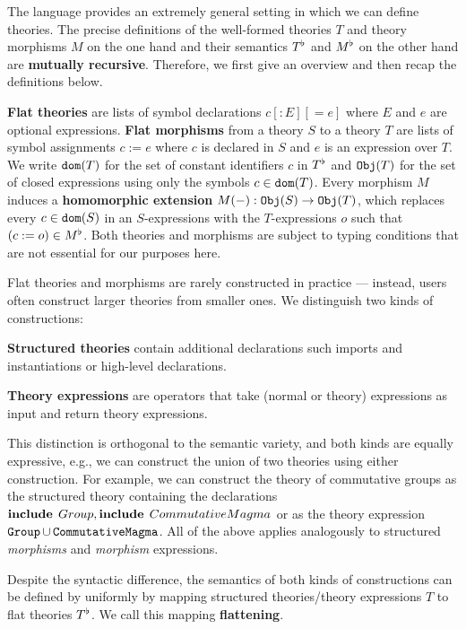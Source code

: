 The \mmt language \cite{RK:mmt:10} provides an extremely general setting in which we can define theories.
The precise definitions of the well-formed theories $T$ and theory morphisms $M$ on the one hand and their semantics $T^\flat$ and $M^\flat$ on the other hand are \textbf{mutually recursive}.
Therefore, we first give an overview and then recap the definitions below.

\textbf{Flat theories} are lists of symbol declarations $c[:E][=e]$ where $E$ and $e$ are optional expressions.
\textbf{Flat morphisms} from a theory $S$ to a theory $T$ are lists of symbol assignments $c:=e$ where $c$ is declared in $S$ and $e$ is an expression over $T$.
We write $\mathtt{dom}(T)$ for the set of constant identifiers $c$ in $T^\flat$ and $\mathtt{Obj}(T)$ for the set of closed expressions using only the symbols $c\in\mathtt{dom}(T)$.
Every morphism $M$ induces a \textbf{homomorphic extension} $M(-):\mathtt{Obj}(S)\to\mathtt{Obj}(T)$, which replaces every $c\in\mathtt{dom}(S)$ in an $S$-expressions with the $T$-expressions $o$ such that $(c:=o) \in M^\flat$.
Both theories and morphisms are subject to typing conditions that are not essential for our purposes here.

Flat theories and morphisms are rarely constructed in practice --- instead, users often construct larger theories from smaller ones.
We distinguish two kinds of constructions:
\begin{compactitem}
 \item \textbf{Structured theories} contain additional declarations such imports and instantiations or high-level declarations.
 \item \textbf{Theory expressions} are operators that take (normal or theory) expressions as input and return theory expressions.
\end{compactitem}
This distinction is orthogonal to the semantic variety, and both kinds are equally expressive, e.g., we can construct the union of two theories using either construction.
For example, we can construct the theory of commutative groups as the structured theory containing the declarations $\operatorname{\mathbf{include}}{\;Group},\operatorname{\mathbf{include}}{\;CommutativeMagma}$ or as the theory expression $\operatorname{\mathtt{Group}}\cup\operatorname{\mathtt{CommutativeMagma}}$.
All of the above applies analogously to structured \emph{morphisms} and \emph{morphism} expressions.

Despite the syntactic difference, the semantics of both kinds of constructions can be defined by uniformly by mapping structured theories/theory expressions $T$ to flat theories $T^\flat$.
We call this mapping \textbf{flattening}.

